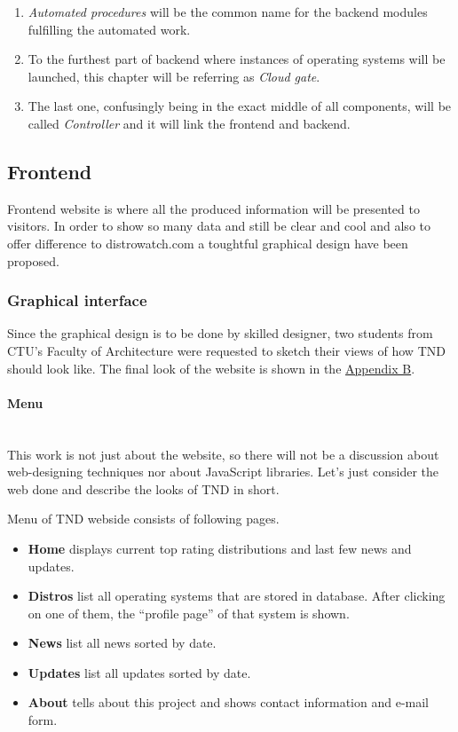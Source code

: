 \documentclass[thesis=B,english]{FITthesis}[2013/04/26]
\newcommand{\myparagraph}[1]{\paragraph{#1}\mbox{}\\}
\begin{document}
\begin{enumerate}
	\item \emph{Automated procedures} will be the common name for the backend modules fulfilling the automated work.
	\item To the furthest part of backend where instances of operating systems will be launched, this chapter will be referring as \emph{Cloud gate}.
	\item The last one, confusingly being in the exact middle of all components, will be called \emph{Controller} and it will link the frontend and backend.
\end{enumerate}

\subsection{Frontend}

Frontend website is where all the produced information will be presented to visitors. In order to show so many data and still be clear and cool and also to offer difference to distrowatch.com a toughtful graphical design have been proposed.

\subsubsection{Graphical interface}

Since the graphical design is to be done by skilled designer, two students from CTU's Faculty of Architecture were requested to sketch their views of how TND should look like. The final look of the website is shown in the \hyperref[TODO]{Appendix B}.

\myparagraph{Menu}

This work is not just about the website, so there will not be a discussion about web-designing techniques nor about JavaScript libraries. Let's just consider the web done and describe the looks of TND in short.

Menu of TND webside consists of following pages.

\begin{itemize}
	\item \textbf{Home} displays current top rating distributions and last few news and updates. 
	\item \textbf{Distros} list all operating systems that are stored in database. After clicking on one of them, the ``profile page'' of that system is shown.
	\item \textbf{News} list all news sorted by date.
	\item \textbf{Updates} list all updates sorted by date. 
	\item \textbf{About} tells about this project and shows contact information and e-mail form.
\end{itemize}
\end{document}
